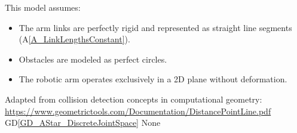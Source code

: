 \documentclass[12pt]{article}
\newcommand{\dref}[1]{GD\ref{#1}}
\newcommand{\aref}[1]{A\ref{#1}}
\begin{document}
{
This model assumes:

\begin{itemize}
    \item The arm links are perfectly rigid and represented as straight line segments (\aref{A_LinkLengthsConstant}).
    \item Obstacles are modeled as perfect circles.
    \item The robotic arm operates exclusively in a 2D plane without deformation.
\end{itemize}
}
{
Adapted from collision detection concepts in computational geometry: \\
\url{https://www.geometrictools.com/Documentation/DistancePointLine.pdf}
}
{
\dref{GD_AStar_DiscreteJointSpace}
}
{
None
}
{}
\end{document}
